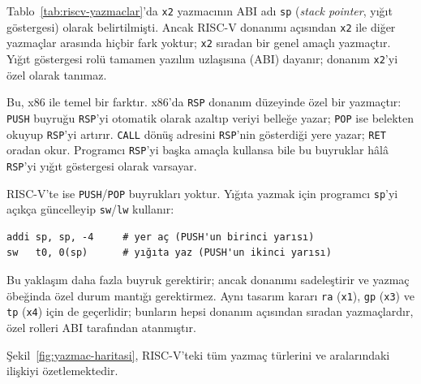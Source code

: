 \begin{bilginot}
Tablo~\ref{tab:riscv-yazmaclar}'da \texttt{x2} yazmacının ABI adı \texttt{sp} (\emph{stack pointer}, yığıt göstergesi) olarak belirtilmişti. Ancak RISC-V donanımı açısından \texttt{x2} ile diğer yazmaçlar arasında hiçbir fark yoktur; \texttt{x2} sıradan bir genel amaçlı yazmaçtır. Yığıt göstergesi rolü tamamen yazılım uzlaşısına (ABI) dayanır; donanım \texttt{x2}'yi özel olarak tanımaz.

Bu, x86 ile temel bir farktır. x86'da \texttt{RSP} donanım düzeyinde özel bir yazmaçtır: \texttt{PUSH} buyruğu \texttt{RSP}'yi otomatik olarak azaltıp veriyi belleğe yazar; \texttt{POP} ise belekten okuyup \texttt{RSP}'yi artırır. \texttt{CALL} dönüş adresini \texttt{RSP}'nin gösterdiği yere yazar; \texttt{RET} oradan okur. Programcı \texttt{RSP}'yi başka amaçla kullansa bile bu buyruklar hâlâ \texttt{RSP}'yi yığıt göstergesi olarak varsayar.

RISC-V'te ise \texttt{PUSH}/\texttt{POP} buyrukları yoktur. Yığıta yazmak için programcı \texttt{sp}'yi açıkça güncelleyip \texttt{sw}/\texttt{lw} kullanır:
\begin{lstlisting}[style=riscv]
addi sp, sp, -4     # yer aç (PUSH'un birinci yarısı)
sw   t0, 0(sp)      # yığıta yaz (PUSH'un ikinci yarısı)
\end{lstlisting}
Bu yaklaşım daha fazla buyruk gerektirir; ancak donanımı sadeleştirir ve yazmaç öbeğinda özel durum mantığı gerektirmez. Aynı tasarım kararı \texttt{ra} (\texttt{x1}), \texttt{gp} (\texttt{x3}) ve \texttt{tp} (\texttt{x4}) için de geçerlidir; bunların hepsi donanım açısından sıradan yazmaçlardır, özel rolleri ABI tarafından atanmıştır.
\end{bilginot}

Şekil~\ref{fig:yazmac-haritasi}, RISC-V'teki tüm yazmaç türlerini ve aralarındaki ilişkiyi özetlemektedir.

